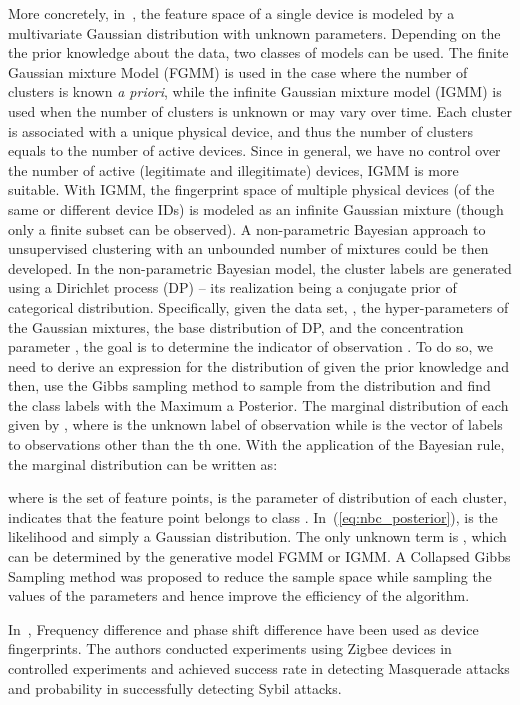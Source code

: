 \documentclass[journal,draftcls,onecolumn,11pt]{IEEEtran}
\begin{document}
More concretely, in~\cite{Nguyen2011}, the feature space of a single device is modeled by a multivariate Gaussian distribution with unknown parameters. Depending on the the prior knowledge about the data, two classes of models can be used. The finite Gaussian mixture Model (FGMM) is used in the case where the number of clusters is known {\it a priori}, while the infinite Gaussian mixture model (IGMM) is used when the number of clusters is unknown or may vary over time. Each cluster is associated with a unique physical device, and thus the number of clusters equals to the number of active devices. Since in general, we have no control over the number of active (legitimate and illegitimate) devices, IGMM is more suitable. With IGMM, the fingerprint space of multiple physical devices (of the same or different device IDs) is modeled as an infinite Gaussian mixture (though only a finite subset can be observed). A non-parametric Bayesian approach to unsupervised clustering with an unbounded number of mixtures could be then developed. In the non-parametric Bayesian model, the cluster labels are generated using a Dirichlet process (DP) -- its realization being a conjugate prior of categorical distribution. Specifically, given the data set, , the hyper-parameters of the Gaussian mixtures,  the base distribution of DP, and the concentration parameter , the goal is to determine the indicator  of observation . To do so, we need to derive an expression for the distribution of  given the prior knowledge and then, use the Gibbs sampling method to sample from the distribution and find the class labels with the Maximum a Posterior.  The marginal distribution of each  given by , where  is the unknown label of observation  while  is the vector of labels to observations other than the th one. With the application of the Bayesian rule, the marginal distribution can be written as:


where  is the set of feature points,  is the parameter of distribution of each cluster,  indicates that the feature point  belongs to class . In~(\ref{eq:nbc_posterior}),  is the likelihood and simply a Gaussian distribution. The only unknown term is , which can be determined by the generative model FGMM or IGMM. A Collapsed Gibbs Sampling method was proposed to reduce the sample space while sampling the values of the parameters and hence improve the efficiency of the algorithm.

In~\cite{Nguyen2011}, Frequency difference and phase shift difference have been used as device fingerprints. The authors conducted experiments using Zigbee devices in controlled experiments and achieved  success rate in detecting Masquerade attacks and  probability in successfully detecting Sybil attacks.
\end{document}
